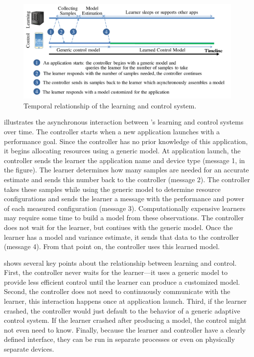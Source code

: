 \begin{figure}
  \includegraphics[width=\columnwidth]{figures/Timeline.pdf}
  \caption{Temporal relationship of the learning and control system.}
  \label{fig:timeline}
\end{figure}

 illustrates the asynchronous interaction between
\SYSTEM{}'s learning and control systems over time. The controller
starts when a new application launches with a performance goal.  Since
the controller has no prior knowledge of this application, it begins
allocating resources using a generic model.  At application launch,
the controller sends the learner the application name and device type
(message 1, in the figure).  The learner determines how many samples
are needed for an accurate estimate and sends this number back to the
controller (message 2).  The controller takes these samples while
using the generic model to determine resource configurations and sends
the learner a message with the performance and power of each measured
configuration (message 3).  Computationally expensive learners may
require some time to build a model from these observations.  The
controller does not wait for the learner, but contiues with the
generic model.  Once the learner has a model and variance estimate, it
sends that data to the controller (message 4). From that point on, the
controller uses this learned model.

 shows several key points about the relationship
between learning and control.  First, the controller never waits for
the learner---it uses a generic model to provide less efficient
control until the learner can produce a customized model. Second, the
controller does not need to continuously communicate with the learner,
this interaction happens once at application launch.  Third, if the
learner crashed, the controller would just default to the behavior of
a generic adaptive control system.  If the learner crashed after
producing a model, the control might not even need to know.  Finally,
because the learner and controller have a clearly defined interface,
they can be run in separate processes or even on physically separate
devices.

